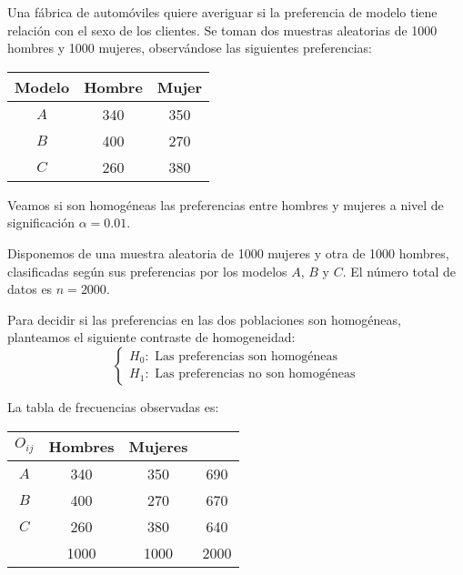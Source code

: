 \begin{example}
    Una fábrica de automóviles quiere averiguar si la preferencia de modelo tiene relación con el sexo de los clientes.
    Se toman dos muestras aleatorias de 1000 hombres y 1000 mujeres, observándose las siguientes preferencias:
    \begin{center}
        \begin{tabular}{| c | c c |}
            \hline
            Modelo & Hombre & Mujer \\
            \hline
            $A$    & 340    & 350   \\
            $B$    & 400    & 270   \\
            $C$    & 260    & 380   \\
            \hline
        \end{tabular}
    \end{center}
    Veamos si son homogéneas las preferencias entre hombres y mujeres a nivel de significación $\alpha = 0.01$.

    Disponemos de una muestra aleatoria de 1000 mujeres y otra de 1000 hombres, clasificadas según sus preferencias por los modelos $A$, $B$ y $C$.
    El número total de datos es $n = 2000$.

    Para decidir si las preferencias en las dos poblaciones son homogéneas, planteamos el siguiente contraste de homogeneidad:
    $$\begin{cases}
            H_0: \text{ Las preferencias son homogéneas} \\
            H_1: \text{ Las preferencias no son homogéneas}
        \end{cases}$$

    La tabla de frecuencias observadas es:
    \begin{center}
        \begin{tabular}{| c | c c | c |}
            \hline
            $O_{ij}$ & Hombres & Mujeres &      \\
            \hline
            $A$      & 340     & 350     & 690  \\
            $B$      & 400     & 270     & 670  \\
            $C$      & 260     & 380     & 640  \\
            \hline
                     & 1000    & 1000    & 2000 \\
            \hline
        \end{tabular}
    \end{center}


\end{example}
